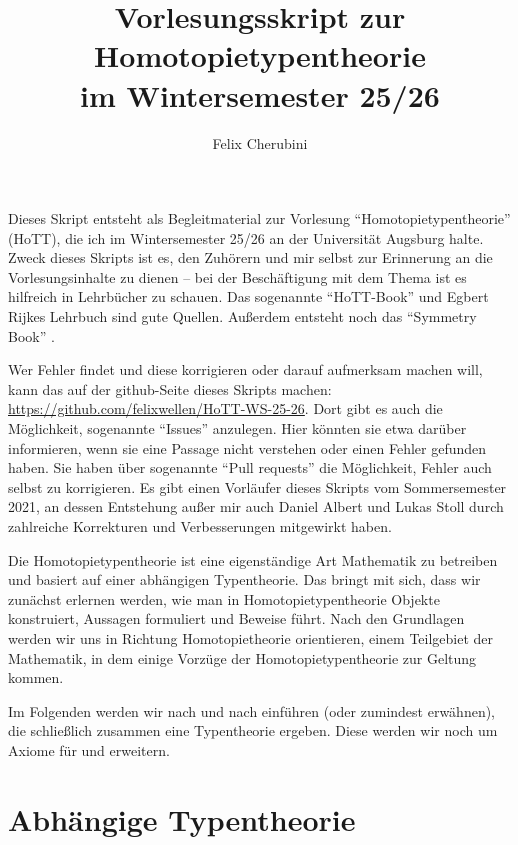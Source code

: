 \documentclass{../util/hott}
\title{Vorlesungsskript zur Homotopietypentheorie \\ im Wintersemester 25/26}
\author{Felix Cherubini}
\begin{document}
\maketitle

\tableofcontents
 \pagebreak
Dieses Skript entsteht als Begleitmaterial zur Vorlesung ``Homotopietypentheorie'' (HoTT), die ich im Wintersemester 25/26 an der Universität Augsburg halte.
Zweck dieses Skripts ist es, den Zuhörern und mir selbst zur Erinnerung an die Vorlesungsinhalte zu dienen --
bei der Beschäftigung mit dem Thema ist es hilfreich in Lehrbücher zu schauen.
Das sogenannte ``HoTT-Book''\cite{hott} und Egbert Rijkes Lehrbuch \cite{rijke} sind gute Quellen.
Außerdem entsteht noch das ``Symmetry Book'' \cite{Sym}.

Wer Fehler findet und diese korrigieren oder darauf aufmerksam machen will, kann das auf der github-Seite dieses Skripts machen:
\href{https://github.com/felixwellen/HoTT-WS-25-26}{https://github.com/felixwellen/HoTT-WS-25-26}.
Dort gibt es auch die Möglichkeit, sogenannte ``Issues'' anzulegen.
Hier könnten sie etwa darüber informieren, wenn sie eine Passage nicht verstehen oder einen Fehler gefunden haben.
Sie haben über sogenannte ``Pull requests'' die Möglichkeit, Fehler auch selbst zu korrigieren.
Es gibt einen Vorläufer dieses Skripts vom Sommersemester 2021, an dessen Entstehung außer mir auch Daniel Albert und Lukas Stoll durch zahlreiche Korrekturen und Verbesserungen mitgewirkt haben.

Die Homotopietypentheorie ist eine eigenständige Art Mathematik zu betreiben und basiert auf einer abhängigen Typentheorie.
Das bringt mit sich, dass wir zunächst erlernen werden, wie man in Homotopietypentheorie Objekte konstruiert, Aussagen formuliert und Beweise führt.
Nach den Grundlagen werden wir uns in Richtung Homotopietheorie orientieren, einem Teilgebiet der Mathematik, in dem einige Vorzüge der Ho\-mo\-to\-pie\-ty\-pen\-theo\-rie zur Geltung kommen.

Im Folgenden werden wir nach und nach  einführen (oder zumindest erwähnen), die schließlich zusammen eine Typentheorie ergeben.
Diese werden wir noch um Axiome für  und  erweitern.

\section{Abhängige Typentheorie}


\printindex

\printbibliography
\end{document}
